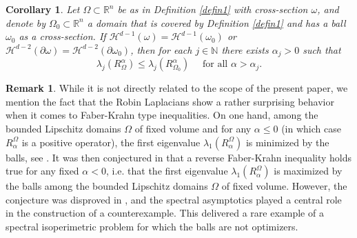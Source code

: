 \documentclass[11pt,oneside,reqno,a4paper]{amsart}
\newcommand{\N}{\mathbb{N}}
\newcommand{\R}{\mathbb{R}}
\renewcommand{\H}{\mathcal{H}}
\newtheorem{corollary}[theorem]{Corollary}
\theoremstyle{definition}
\newtheorem{remark}[theorem]{Remark}
\begin{document}
\begin{corollary}
	Let $\Omega\subset\R^{n}$ be as in Definition \ref{defin1} with cross-section $\omega$, and denote by $\Omega_0\subset\R^{n}$ a domain that is covered by Definition \ref{defin1} and has a ball $\omega_0$ as a cross-section. If $\H^{d-1}(\omega)=\H^{d-1}(\omega_0)$ or $\H^{d-2}(\partial\omega)=\H^{d-2}(\partial\omega_0)$, then for each $j\in\N$ there exists $\alpha_j>0$ such that
	\[
	\lambda_j(R_{\Omega}^\alpha)\le \lambda_j(R_{\Omega_0}^\alpha)\quad \text{ for all $\alpha>\alpha_j$}.
	\]
\end{corollary}


	
\begin{remark}	While it is not directly related to the scope of the present paper, we mention the fact
	that the Robin Laplacians show a rather surprising behavior when it comes to Faber-Krahn type inequalities. On one hand,
	among the bounded Lipschitz domains $\Omega$ of fixed volume and for any $\alpha\le0$ (in which case $R^\Omega_\alpha$ is a positive operator), the first eigenvalue $\lambda_1(R^\Omega_\alpha)$ is minimized by the balls, see \cite{daners2}. It was then conjectured in \cite{bareket,brock} that a reverse Faber-Krahn inequality holds true for any fixed $\alpha<0$, i.e.
	that the first eigenvalue $\lambda_1(R^\Omega_\alpha)$ is maximized by the balls among the bounded Lipschitz domains $\Omega$ of fixed volume. However, the conjecture was disproved in \cite{FK}, and the spectral asymptotics played a central role
	in the construction of a counterexample. This delivered a rare example of a spectral isoperimetric problem
	for which the balls are not optimizers.
\end{remark}
	
\end{document}
